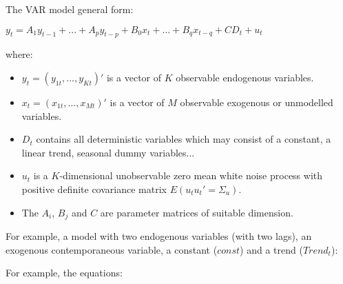 \documentclass[10pt, a4paper, landscape]{extarticle}
\begin{document}
\begin{multicols}{3}
The VAR model general form:

$y_t = A_1 y_{t-1} + ... + A_p y_{t-p} + B_0 x_t + ... + B_q x_{t-q} + CD_t + u_t$

where:

\begin{itemize}[leftmargin=*]
	\item $y_t = (y_{1t}, ..., y_{Kt})'$ is a vector of $K$ observable endogenous variables.
	\item $x_t = (x_{1t}, ..., x_{Mt})'$ is a vector of $M$ observable exogenous or unmodelled variables.
	\item $D_t$ contains all deterministic variables which may consist of a constant, a linear trend, seasonal dummy variables...
	\item $u_t$ is a $K$-dimensional unobservable zero mean white noise process with positive definite covariance matrix $E(u_t u_t' = \Sigma_u)$.
	\item The $A_i$, $B_j$ and $C$ are parameter matrices of suitable dimension.
\end{itemize}

For example, a model with two endogenous variables (with two lags), an exogenous contemporaneous variable, a constant ($const$) and a trend ($Trend_t$):



For example, the equations:



\end{multicols}
\end{document}
